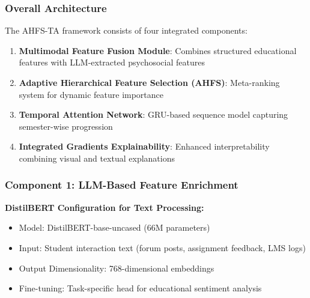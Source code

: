 \subsubsection{Overall Architecture}

The AHFS-TA framework consists of four integrated components:
\begin{enumerate}
\item \textbf{Multimodal Feature Fusion Module}: Combines structured educational features with LLM-extracted psychosocial features
\item \textbf{Adaptive Hierarchical Feature Selection (AHFS)}: Meta-ranking system for dynamic feature importance
\item \textbf{Temporal Attention Network}: GRU-based sequence model capturing semester-wise progression
\item \textbf{Integrated Gradients Explainability}: Enhanced interpretability combining visual and textual explanations
\end{enumerate}

\subsubsection{Component 1: LLM-Based Feature Enrichment}

\textbf{DistilBERT Configuration for Text Processing:}
\begin{itemize}
\item Model: DistilBERT-base-uncased (66M parameters)
\item Input: Student interaction text (forum posts, assignment feedback, LMS logs)
\item Output Dimensionality: 768-dimensional embeddings
\item Fine-tuning: Task-specific head for educational sentiment analysis
\end{itemize}

